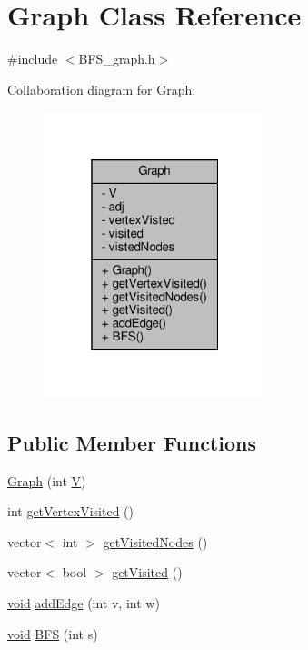 \hypertarget{classGraph}{}\section{Graph Class Reference}
\label{classGraph}


{\ttfamily \#include $<$B\+F\+S\+\_\+graph.\+h$>$}



Collaboration diagram for Graph\+:
\nopagebreak
\begin{figure}[H]
\begin{center}
\leavevmode
\includegraphics[width=184pt]{classGraph__coll__graph}
\end{center}
\end{figure}
\subsection*{Public Member Functions}
\begin{DoxyCompactItemize}
\item 
\hyperlink{classGraph_af3ff6b295df8bf3bee0bafd7c7d56915}{Graph} (int \hyperlink{classGraph_a2b722f7cfa7a21e4cb5fae488b3d4dcc}{V})
\item 
int \hyperlink{classGraph_aadc98e5429733e558f1f767cba1dde9e}{get\+Vertex\+Visited} ()
\item 
vector$<$ int $>$ \hyperlink{classGraph_a6f9b74116cdced24d19fe71f85744bb3}{get\+Visited\+Nodes} ()
\item 
vector$<$ bool $>$ \hyperlink{classGraph_a5d0ad2cf2f8ea740e15960de96a50997}{get\+Visited} ()
\item 
\hyperlink{imgui__impl__opengl3__loader_8h_ac668e7cffd9e2e9cfee428b9b2f34fa7}{void} \hyperlink{classGraph_a8a3b5afce00f9d260b01c188fbe73f53}{add\+Edge} (int v, int w)
\item 
\hyperlink{imgui__impl__opengl3__loader_8h_ac668e7cffd9e2e9cfee428b9b2f34fa7}{void} \hyperlink{classGraph_a8f2fda3cb9843eaeee715cc4906ea347}{B\+FS} (int s)
\end{DoxyCompactItemize}
